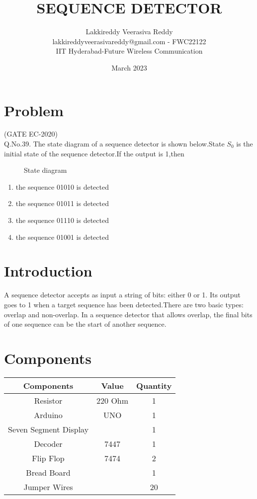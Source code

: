 \documentclass{article}
\title{SEQUENCE DETECTOR}
\date{March 2023}
\author{Lakkireddy Veerasiva Reddy\\lakkireddyveerasivareddy@gmail.com - FWC22122\\IIT Hyderabad-Future Wireless Communication}
\begin{document}
\maketitle
\tableofcontents
	\pagebreak
\section{Problem}
	(GATE EC-2020)\\
	Q.No.39. The state diagram of a sequence detector is shown below.State $S_0$ is the initial state of the sequence detector.If the output is 1,then
 \begin{figure}[h]
  
  \caption{State diagram}
  \label{fig:1}		
  \end{figure}	 
\begin{enumerate}
 \item the sequence 01010 is detected
 \item the sequence 01011 is detected
 \item the sequence 01110 is detected
 \item the sequence 01001 is detected	 
\end{enumerate}	
\section{Introduction}
  A sequence detector accepts as input a string of bits: either 0 or 1. Its output goes to 1 when a target sequence has been detected.There are two basic types:  overlap  and  non-overlap. In a sequence detector that allows overlap, the final bits of one sequence can be  the start of another sequence.
	\section{Components}	
\begin{table}[h]
\centering

\begin{tabular}{|c|c|c|}
\hline
Components & Value & Quantity\\
\hline
Resistor & 220 Ohm & 1\\
\hline
Arduino & UNO & 1\\
\hline
Seven Segment Display & & 1\\
\hline
Decoder & 7447 & 1\\
\hline
Flip Flop & 7474 & 2\\
\hline
Bread Board & & 1\\
\hline
Jumper Wires & & 20\\
\hline
\end{tabular}

\vspace{2mm}
\label{table:1}
\end{table}
\vspace{5mm}
\end{document}
